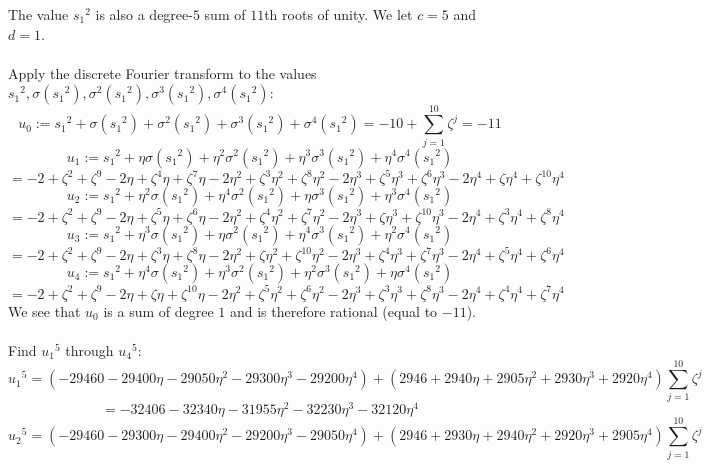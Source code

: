 \documentclass{article}
\begin{document}
        \begin{adjustwidth}{1cm}{}
            The value $ {s_1}^2 $ is also a degree-$ 5 $ sum of $ 11 $th roots of unity. We let $ c = 5 $ and $ d = 1 $.\\
            \\
            Apply the discrete Fourier transform to the values $ {s_1}^2, \sigma({s_1}^2), \sigma^2({s_1}^2), \sigma^3({s_1}^2), \sigma^4({s_1}^2) $:
            $$ u_0 := {s_1}^2 + \sigma({s_1}^2) + \sigma^2({s_1}^2) + \sigma^3({s_1}^2) + \sigma^4({s_1}^2) = -10 + \sum_{j = 1}^10 \zeta^j = -11 $$
            $$ u_1 := {s_1}^2 + \eta \sigma({s_1}^2) + \eta^2 \sigma^2({s_1}^2) + \eta^3 \sigma^3({s_1}^2) + \eta^4 \sigma^4({s_1}^2) $$
            $$ = -2 + \zeta^2 + \zeta^9 - 2 \eta + \zeta^4 \eta + \zeta^7 \eta - 2 \eta^2 + \zeta^3 \eta^2 + \zeta^8 \eta^2 - 2 \eta^3 + \zeta^5 \eta^3 + \zeta^6 \eta^3 - 2 \eta^4 + \zeta \eta^4 + \zeta^{10} \eta^4 $$
            $$ u_2 := {s_1}^2 + \eta^2 \sigma({s_1}^2) + \eta^4 \sigma^2({s_1}^2) + \eta \sigma^3({s_1}^2) + \eta^3 \sigma^4({s_1}^2) $$
            $$ = -2 + \zeta^2 + \zeta^9 - 2 \eta + \zeta^5 \eta + \zeta^6 \eta - 2 \eta^2 + \zeta^4 \eta^2 + \zeta^7 \eta^2 - 2 \eta^3 + \zeta \eta^3 + \zeta^{10} \eta^3 - 2 \eta^4 + \zeta^3 \eta^4 + \zeta^8 \eta^4 $$
            $$ u_3 := {s_1}^2 + \eta^3 \sigma({s_1}^2) + \eta \sigma^2({s_1}^2) + \eta^4 \sigma^3({s_1}^2) + \eta^2 \sigma^4({s_1}^2) $$
            $$ = -2 + \zeta^2 + \zeta^9 - 2 \eta + \zeta^3 \eta + \zeta^8 \eta - 2 \eta^2 + \zeta \eta^2 + \zeta^{10} \eta^2 - 2 \eta^3 + \zeta^4 \eta^3 + \zeta^7 \eta^3 - 2 \eta^4 + \zeta^5 \eta^4 + \zeta^6 \eta^4 $$
            $$ u_4 := {s_1}^2 + \eta^4 \sigma({s_1}^2) + \eta^3 \sigma^2({s_1}^2) + \eta^2 \sigma^3({s_1}^2) + \eta \sigma^4({s_1}^2) $$
            $$ = -2 + \zeta^2 + \zeta^9 - 2 \eta + \zeta \eta + \zeta^{10} \eta - 2 \eta^2 + \zeta^5 \eta^2 + \zeta^6 \eta^2 - 2 \eta^3 + \zeta^3 \eta^3 + \zeta^8 \eta^3 - 2 \eta^4 + \zeta^4 \eta^4 + \zeta^7 \eta^4 $$
            We see that $ u_0 $ is a sum of degree $ 1 $ and is therefore rational (equal to $ -11 $).\\
            \\
            Find $ {u_1}^5 $ through $ {u_4}^5 $:
            $$ {u_1}^5 = (-29460 - 29400 \eta - 29050 \eta^2 - 29300 \eta^3 - 29200 \eta^4) + (2946 + 2940 \eta + 2905 \eta^2 + 2930 \eta^3 + 2920 \eta^4) \sum_{j = 1}^{10} \zeta^j $$
            $$ = -32406 - 32340 \eta - 31955 \eta^2 - 32230 \eta^3 - 32120 \eta^4 $$
            $$ {u_2}^5 = (-29460 - 29300 \eta - 29400 \eta^2 - 29200 \eta^3 - 29050 \eta^4) + (2946 + 2930 \eta + 2940 \eta^2 + 2920 \eta^3 + 2905 \eta^4) \sum_{j = 1}^{10} \zeta^j $$

\end{adjustwidth}
\end{document}
